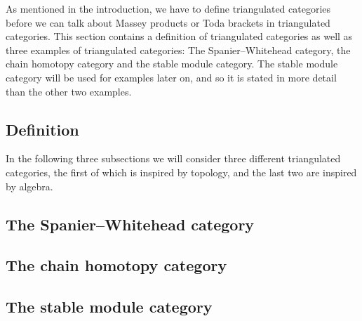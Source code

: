 As mentioned in the introduction, we have to define triangulated categories before we can talk about Massey products or Toda brackets in triangulated categories. This section contains a definition of triangulated categories as well as three examples of triangulated categories: The Spanier--Whitehead category, the chain homotopy category and the stable module category. The stable module category will be used for examples later on, and so it is stated in more detail than the other two examples.

\subsection{Definition}


In the following three subsections we will consider three different triangulated categories, the first of which is inspired by topology, and the last two are inspired by algebra.
\subsection{The Spanier--Whitehead category}
\label{subsubsection:spanier_whitehead_cat}


\subsection{The chain homotopy category}
\label{subsubsection:chain_homotopy_cat}


\subsection{The stable module category}
\label{subsubsection:stable_module_cat}
